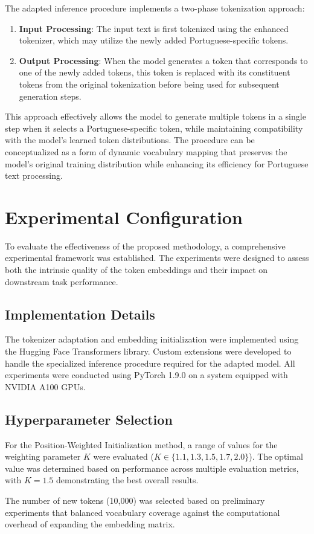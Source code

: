 The adapted inference procedure implements a two-phase tokenization approach:

\begin{enumerate}
    \item \textbf{Input Processing}: The input text is first tokenized using the enhanced tokenizer, which may utilize the newly added Portuguese-specific tokens.
    
    \item \textbf{Output Processing}: When the model generates a token that corresponds to one of the newly added tokens, this token is replaced with its constituent tokens from the original tokenization before being used for subsequent generation steps.
\end{enumerate}

This approach effectively allows the model to generate multiple tokens in a single step when it selects a Portuguese-specific token, while maintaining compatibility with the model's learned token distributions. The procedure can be conceptualized as a form of dynamic vocabulary mapping that preserves the model's original training distribution while enhancing its efficiency for Portuguese text processing.

\section{Experimental Configuration}
To evaluate the effectiveness of the proposed methodology, a comprehensive experimental framework was established. The experiments were designed to assess both the intrinsic quality of the token embeddings and their impact on downstream task performance.

\subsection{Implementation Details}
The tokenizer adaptation and embedding initialization were implemented using the Hugging Face Transformers library. Custom extensions were developed to handle the specialized inference procedure required for the adapted model. All experiments were conducted using PyTorch 1.9.0 on a system equipped with NVIDIA A100 GPUs.

\subsection{Hyperparameter Selection}
For the Position-Weighted Initialization method, a range of values for the weighting parameter $K$ were evaluated ($K \in \{1.1, 1.3, 1.5, 1.7, 2.0\}$). The optimal value was determined based on performance across multiple evaluation metrics, with $K = 1.5$ demonstrating the best overall results.

The number of new tokens (10,000) was selected based on preliminary experiments that balanced vocabulary coverage against the computational overhead of expanding the embedding matrix.


